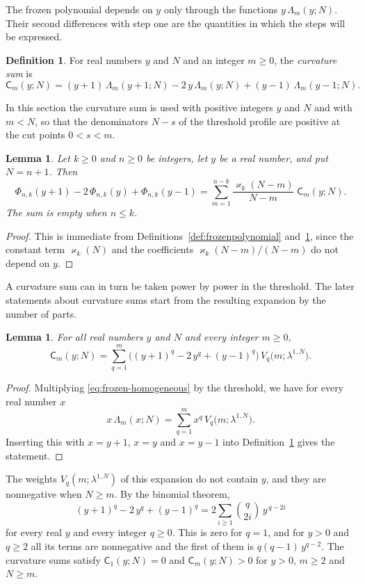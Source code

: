 \documentclass{amsart}
\newtheorem{lemma}[theorem]{Lemma}
\theoremstyle{definition}
\newtheorem{definition}[theorem]{Definition}
\theoremstyle{remark}
\numberwithin{equation}{section}
\begin{document}
The frozen polynomial depends on $y$ only through the functions
$y\,\Lambda_m(y;N)$. Their second differences with step one are the
quantities in which the steps will be expressed.

\begin{definition}\label{def:curvaturesum}
For real numbers $y$ and $N$ and an integer $m\ge0$, the \emph{curvature
sum} is
\[
\mathsf C_m(y;N)=(y+1)\,\Lambda_m(y+1;N)-2\,y\,\Lambda_m(y;N)+(y-1)\,\Lambda_m(y-1;N).
\]
\end{definition}

In this section the curvature sum is used with positive integers $y$ and
$N$ and with $m<N$, so that the denominators $N-s$ of the threshold profile
are positive at the cut points $0<s<m$.

\begin{lemma}\label{lem:frozendifference}
Let $k\ge0$ and $n\ge0$ be integers, let $y$ be a real number, and put
$N=n+1$. Then
\[
\Phi_{n,k}(y+1)-2\,\Phi_{n,k}(y)+\Phi_{n,k}(y-1)
=\sum_{m=1}^{n-k}\frac{\varkappa_k(N-m)}{N-m}\;\mathsf C_m(y;N).
\]
The sum is empty when $n\le k$.
\end{lemma}

\begin{proof}
This is immediate from Definitions~\ref{def:frozenpolynomial}
and~\ref{def:curvaturesum}, since the constant term $\varkappa_k(N)$ and the
coefficients $\varkappa_k(N-m)/(N-m)$ do not depend on $y$.
\end{proof}

A curvature sum can in turn be taken power by power in the threshold. The
later statements about curvature sums start from the resulting expansion by
the number of parts.

\begin{lemma}\label{lem:curvatureparts}
For all real numbers $y$ and $N$ and every integer $m\ge0$,
\[
\mathsf C_m(y;N)=\sum_{q=1}^{m}\bigl((y+1)^q-2\,y^q+(y-1)^q\bigr)\,
V_q\bigl(m;\lambda^{1,N}\bigr).
\]
\end{lemma}

\begin{proof}
Multiplying \eqref{eq:frozen-homogeneous} by the threshold, we have for
every real number $x$
\[
x\,\Lambda_m(x;N)=\sum_{q=1}^{m}x^{q}\,V_q\bigl(m;\lambda^{1,N}\bigr).
\]
Inserting this with $x=y+1$, $x=y$ and $x=y-1$ into
Definition~\ref{def:curvaturesum} gives the statement.
\end{proof}

The weights $V_q(m;\lambda^{1,N})$ of this expansion do not contain $y$,
and they are nonnegative when
$N\ge m$. By the binomial theorem,
\begin{equation}\label{eq:frozen-binomial}
(y+1)^q-2\,y^q+(y-1)^q=2\sum_{i\ge1}\binom{q}{2i}\,y^{\,q-2i}
\end{equation}
for every real $y$ and every integer $q\ge0$. This is zero for $q=1$, and
for $y>0$ and $q\ge2$ all its terms are nonnegative and the first of them is
$q(q-1)\,y^{q-2}$. The curvature sums satisfy $\mathsf C_1(y;N)=0$ and
$\mathsf C_m(y;N)>0$ for $y>0$, $m\ge2$ and $N\ge m$.
\end{document}
